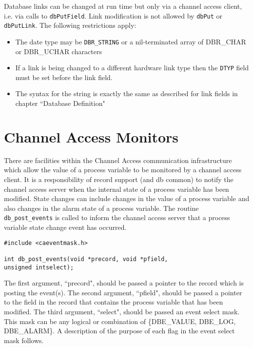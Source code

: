 Database links can be changed at run time but only via a channel access client,
i.e. via calls to \verb|dbPutField|.  Link modification is not allowed by \verb|dbPut| or \verb|dbPutLink|.
The following restrictions apply:

\begin{itemize}
\item The date type may be \verb|DBR_STRING| or a nil-terminated array of DBR\_CHAR or DBR\_UCHAR characters

\item If a link is being changed to a different hardware link type then the \verb|DTYP| field must be set before the link field.

\item The syntax for the string is exactly the same as described for link fields in chapter ``Database Definition"

\end{itemize}

\section{Channel Access Monitors}

There are facilities within the Channel Access communication infrastructure which allow the value of a process variable to be monitored by a channel access client.
It is a responsibility of record support (and db common) to notify the channel access server when the internal state of a process variable has been modified.
State changes can include changes in the value of a process variable and also changes in the alarm state of a process variable.
The routine \verb|db_post_events| is called to inform the channel access server that a process variable state change event has occurred.

\begin{verbatim}
#include <caeventmask.h>

int db_post_events(void *precord, void *pfield,
unsigned intselect);
\end{verbatim}

The first argument, ``precord", should be passed a pointer to the record which is posting the event(s).
The second argument, ``pfield", should be passed a pointer to the field in the record that contains the process variable that has been modified.
The third argument, ``select", should be passed an event select mask.
This mask can be any logical or combination of \{DBE\_VALUE, DBE\_LOG, DBE\_ALARM\}.
A description of the purpose of each flag in the event select mask follows.


